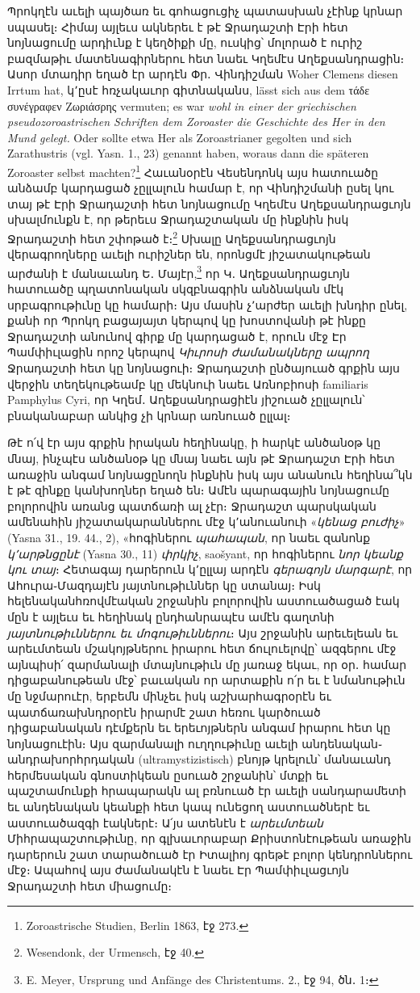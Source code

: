\documentclass{article}
\begin{document}
{Պրոկղէն աւելի պայծառ եւ գոհացուցիչ պատասխան չէինք կրնար սպասել։ Հիմայ այլեւս ակներեւ է թէ Ջրադաշտի Էրի հետ նոյնացումը արդիւնք է կեղծիքի մը, ուսկից՝ մոլորած է ուրիշ բազմաթիւ մատենագիրներու հետ նաեւ Կղեմէս Աղեքսանդրացին։ Ասոր մտադիր եղած էր արդէն Փր․ Վինդիշման Woher Clemens diesen Irrtum hat, կ՚ըսէ հռչակաւոր գիտնականս, lässt sich aus dem τάδε συνέγραφεν Ζωριάσρης vermuten; es war \emph{wohl in einer der griechischen pseudozoroastrischen Schriften dem Zoroaster die Geschichte des Her in den Mund gelegt.} Oder sollte etwa Her als Zoroastrianer gegolten und sich Zarathustris (vgl. Yasn. 1., 23) genannt haben, woraus dann die späteren Zoroaster selbst machten?\footnote{Zoroastrische Studien, Berlin 1863, էջ 273.} Հաւանօրէն Վեսենդոնկ այս հատուածը անձամբ կարդացած չըլլալուն համար է, որ Վինդիշմանի ըսել կու տայ թէ Էրի Ջրադաշտի հետ նոյնացումը Կղեմէս Աղեքսանդրացւոյն սխալմունքն է, որ թերեւս Ջրադաշտական մը ինքնին իսկ Ջրադաշտի հետ շփոթած է։\footnote{Wesendonk, der Urmensch, էջ 40.} Սխալը Աղեքսանդրացւոյն վերագրողները աւելի ուրիշներ են, որոնցմէ յիշատակութեան արժանի է մանաւանդ Ե․ Մայէր,\footnote{E. Meyer, Ursprung und Anfänge des Christentums. 2., էջ 94, ծն․ 1։} որ Կ․ Աղեքսանդրացւոյն հատուածը պղատոնական սկզբնագրին անձնական մէկ սրբագրութիւնը կը համարի։ Այս մասին չ՚արժեր աւելի խնդիր ընել, քանի որ Պրոկղ բացայայտ կերպով կը խոստովանի թէ ինքը Ջրադաշտի անունով գիրք մը կարդացած է, որուն մէջ Էր Պամփիւլացին որոշ կերպով \emph{Կիւրոսի ժամանակները ապրող} Ջրադաշտի հետ կը նոյնացուի։ Ջրադաշտի ընծայուած գրքին այս վերջին տեղեկութեամբ կը մեկնուի նաեւ Առնոբիոսի familiaris Pamphylus Cyri, որ Կղեմ․ Աղեքսանդրացիէն յիշուած չըլլալուն՝ բնականաբար անկից չի կրնար առնուած ըլլալ։

Թէ ո՛վ էր այս գրքին իրական հեղինակը, ի հարկէ անծանօթ կը մնայ, ինչպէս անծանօթ կը մնայ նաեւ այն թէ Ջրադաշտ Էրի հետ առաջին անգամ նոյնացընողն ինքնին իսկ այս անանուն հեղինա՞կն է թէ զինքը կանխողներ եղած են։ Ամէն պարագային նոյնացումը բոլորովին առանց պատճառի ալ չէր։ Ջրադաշտ պարսկական ամենահին յիշատակարաններու մէջ կ՚անուանուի «\emph{կենաց բուժիչ}» (Yasna 31., 19. 44., 2), «հոգիներու \emph{պահապան}, որ նաեւ զանոնք \emph{կ՚արթնցընէ} (Yasna 30., 11) \emph{փրկիչ}, saošyant, որ հոգիներու \emph{նոր կեանք կու տայ}։ Հետագայ դարերուն կ՚ըլլայ արդէն \emph{գերագոյն մարգարէ}, որ Ահուրա֊Մազդայէն յայտնութիւններ կը ստանայ։ Իսկ հելենականհռովմէական շրջանին բոլորովին աստուածացած էակ մըն է այլեւս եւ հեղինակ ընդհանրապէս ամէն գաղտնի \emph{յայտնութիւններու եւ մոգութիւններու}։ Այս շրջանին արեւելեան եւ արեւմտեան մշակոյթներու իրարու հետ ճուլուելովը՝ ազգերու մէջ այնպիսի՛ զարմանալի մտայնութիւն մը յառաջ եկաւ, որ օր․ համար դիցաբանութեան մէջ՝ բաւական որ արտաքին ո՛ր եւ է նմանութիւն մը նջմարուէր, երբեմն մինչեւ իսկ աշխարհագրօրէն եւ պատճառախնդրօրէն իրարմէ շատ հեռու կարծուած դիցաբանական դէմքերն եւ երեւոյթներն անգամ իրարու հետ կը նոյնացուէին։ Այս զարմանալի ուղղութիւնը աւելի անդենական֊անդրախորհրդական (ultramystizistisch) բնոյթ կրելուն՝ մանաւանդ հերմեսական գնոստիկեան ըսուած շրջանին՝ մտքի եւ պաշտամունքի հրապարակն ալ բռնուած էր աւելի սանդարամետի եւ անդենական կեանքի հետ կապ ունեցող աստուածներէ եւ աստուածազգի էակներէ։ Ա՛յս ատենէն է \emph{արեւմտեան} Միհրապաշտութիւնը, որ գլխաւորաբար Քրիստոնէութեան առաջին դարերուն շատ տարածուած էր Իտալիոյ գրեթէ բոլոր կենդրոններու մէջ։ Ապահով այս ժամանակէն է նաեւ Էր Պամփիւլացւոյն Ջրադաշտի հետ միացումը։

}
\end{document}
